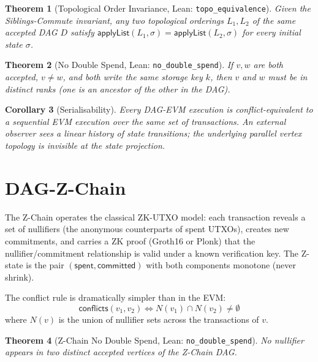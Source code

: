 \documentclass[11pt]{article}
\newtheorem{theorem}{Theorem}
\newtheorem{corollary}[theorem]{Corollary}
\theoremstyle{definition}
\begin{document}
\begin{theorem}[Topological Order Invariance, Lean: \texttt{topo\_equivalence}]
\label{thm:topo}
Given the Siblings-Commute invariant, any two topological orderings $L_1,
L_2$ of the same accepted DAG $D$ satisfy
$\mathsf{applyList}(L_1, \sigma) = \mathsf{applyList}(L_2, \sigma)$
for every initial state $\sigma$.
\end{theorem}

\begin{theorem}[No Double Spend, Lean: \texttt{no\_double\_spend}]
If $v, w$ are both accepted, $v \neq w$, and both write the same storage
key $k$, then $v$ and $w$ must be in distinct ranks (one is an ancestor of
the other in the DAG).
\end{theorem}

\begin{corollary}[Serialisability]
Every DAG-EVM execution is conflict-equivalent to a sequential EVM
execution over the same set of transactions. An external observer sees a
linear history of state transitions; the underlying parallel vertex
topology is invisible at the state projection.
\end{corollary}

\section{DAG-Z-Chain}
\label{sec:dagzchain}

The Z-Chain operates the classical ZK-UTXO model: each transaction reveals
a set of nullifiers (the anonymous counterparts of spent UTXOs), creates
new commitments, and carries a ZK proof (Groth16 or Plonk) that the
nullifier/commitment relationship is valid under a known verification
key. The Z-state is the pair $(\mathsf{spent}, \mathsf{committed})$ with
both components monotone (never shrink).

The conflict rule is dramatically simpler than in the EVM:
\[
\mathsf{conflicts}(v_1, v_2) \iff N(v_1) \cap N(v_2) \neq \emptyset
\]
where $N(v)$ is the union of nullifier sets across the transactions of $v$.

\begin{theorem}[Z-Chain No Double Spend, Lean: \texttt{no\_double\_spend}]
No nullifier appears in two distinct accepted vertices of the Z-Chain DAG.
\end{theorem}
\end{document}
